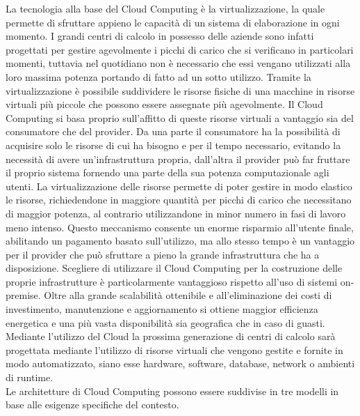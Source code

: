 La tecnologia alla base del Cloud Computing è la virtualizzazione, la quale permette di sfruttare appieno le capacità di un sistema di elaborazione in ogni momento. I grandi centri di calcolo in possesso delle aziende sono infatti progettati per gestire agevolmente i picchi di carico che si verificano in particolari momenti, tuttavia nel quotidiano non è necessario che essi vengano utilizzati alla loro massima potenza portando di fatto ad un sotto utilizzo. Tramite la virtualizzazione è possibile suddividere le risorse fisiche di una macchine in risorse virtuali più piccole che possono essere assegnate più agevolmente. Il Cloud Computing si basa proprio sull’affitto di queste risorse virtuali a vantaggio sia del consumatore che del provider. Da una parte il consumatore ha la possibilità di acquisire solo le risorse di cui ha bisogno e per il tempo necessario, evitando la necessità di avere un’infrastruttura propria, dall’altra il provider può far fruttare il proprio sistema fornendo una parte della sua potenza computazionale agli utenti. La virtualizzazione delle risorse permette di poter gestire in modo elastico le risorse, richiedendone in maggiore quantità per picchi di carico che necessitano di maggior potenza, al contrario utilizzandone in minor numero in fasi di lavoro meno intenso. Questo meccanismo consente un enorme risparmio all’utente finale, abilitando un pagamento basato sull’utilizzo, ma allo stesso tempo è un vantaggio per il provider che può sfruttare a pieno la grande infrastruttura che ha a disposizione.
Scegliere di utilizzare il Cloud Computing per la costruzione delle proprie infrastrutture è particolarmente vantaggioso rispetto all’uso di sistemi on-premise. Oltre alla grande scalabilità ottenibile e all’eliminazione dei costi di investimento, manutenzione e aggiornamento si ottiene maggior efficienza energetica e una più vasta disponibilità sia geografica che in caso di guasti. Mediante l’utilizzo del Cloud la prossima generazione di centri di calcolo sarà progettata mediante l’utilizzo di risorse virtuali che vengono gestite e fornite in modo automatizzato, siano esse hardware, software, database, network o ambienti di runtime.\\
Le architetture di Cloud Computing possono essere suddivise in tre modelli in base alle esigenze specifiche del contesto.


